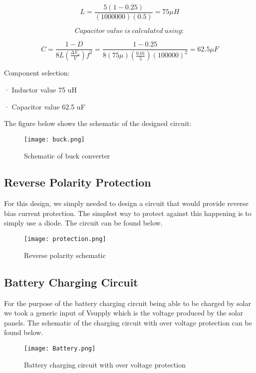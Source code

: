 \documentclass[class=report,11pt,crop=false]{standalone}
\begin{document}
\[
{L = \frac{5(1 - 0.25)}{(1000000)(0.5)} = 75\mu H}\]

\[Capacitor\ value\ is\ calculated\ using:\]

\[C = \frac{1 - D}{8L\left( \frac{\mathrm{\Delta}V_{o}}{V} \right)f^{2}} = \frac{1 - 0.25}{8(75\mu)\left( \frac{0.01}{5} \right)(100000)^{2}} = 62.5\mu F\]


 

 

 

 

 

 

 Component selection:

· Inductor value 75 uH

· Capacitor value 62.5 uF

The figure below shows the schematic of the designed circuit:
\begin{figure}
    \centering
    \texttt{[image: buck.png]}
    \caption{Schematic of buck converter}
\end{figure}

\subsection{Reverse Polarity Protection}

For this design, we simply needed to design a circuit that would provide reverse bias current protection. The simplest way to protect against this happening is to simply use a diode. The circuit can be found below.
\begin{figure}
    \centering
    \texttt{[image: protection.png]}
    \caption{Reverse polarity schematic}
    \label{fig:enter-label}
\end{figure}

\subsection{Battery Charging Circuit}

For the purpose of the battery charging circuit being able to be charged by solar we took a generic input of Vsupply which is the voltage produced by the solar panels. The schematic of the charging circuit with over voltage protection can be found below.
\begin{figure}
    \centering
    \texttt{[image: Battery.png]}
    \caption{Battery charging circuit with over voltage protection}
    \label{fig:enter-label}
\end{figure}
\end{document}
